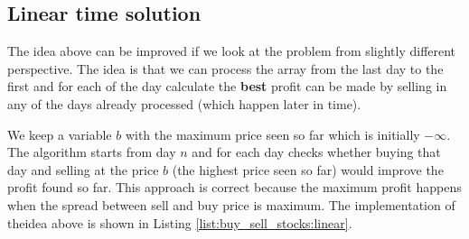 \subsection{Linear time solution}
\label{buy_sell_stocks:sec:linear}
The idea above can be improved if we look at the problem from slightly different perspective. The idea is that we can process the array from the last day to the first and for each of the day calculate the \textbf{best} profit can be made by selling in any of the days already processed (which happen later in time).

We keep a variable $b$ with the maximum price seen so far which is initially $-\infty$. The algorithm starts from day $n$ and for each day checks whether buying that day and selling at the price $b$ (the highest price seen so far) would improve the profit found so far. This approach is correct because the maximum profit happens when the spread between sell and buy price is maximum.
The implementation of theidea above is shown in Listing \ref{list:buy_sell_stocks:linear}.




